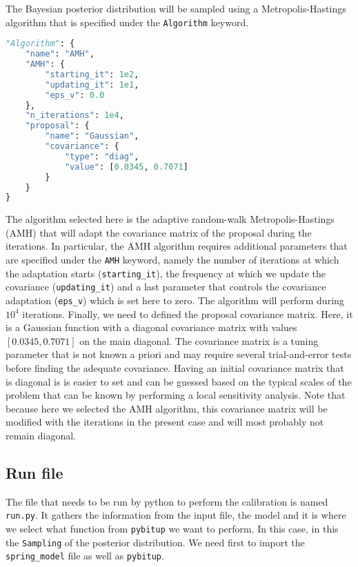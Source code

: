 \documentclass[a4paper,11pt]{article}
\begin{document}
The Bayesian posterior distribution will be sampled using a Metropolis-Hastings algorithm that is specified under the \texttt{Algorithm} keyword.
\begin{lstlisting}[language=Python, breaklines=true, tabsize=4, backgroundcolor=\color{codegray}]
"Algorithm": {
    "name": "AMH", 
    "AMH": {
        "starting_it": 1e2, 
        "updating_it": 1e1, 
        "eps_v": 0.0
    },
    "n_iterations": 1e4, 
    "proposal": { 
        "name": "Gaussian",
        "covariance": { 
            "type": "diag", 
            "value": [0.0345, 0.7071]
        }
    }
}
\end{lstlisting}
The algorithm selected here is the adaptive random-walk Metropolis-Hastings (AMH) that will adapt the covariance matrix of the proposal during the iterations. In particular, the AMH algorithm requires additional parameters that are specified under the \texttt{AMH} keyword, namely the number of iterations at which the adaptation starts (\texttt{starting\_it}), the frequency at which we update the covariance (\texttt{updating\_it}) and a last parameter that controls the covariance adaptation (\texttt{eps\_v}) which is set here to zero. The algorithm will perform during $10^4$ iterations. Finally, we need to defined the proposal covariance matrix. Here, it is a Gaussian function with a diagonal covariance matrix with values $[0.0345, 0.7071]$ on the main diagonal. The covariance matrix is a tuning parameter that is not known a priori and may require several trial-and-error tests before finding the adequate covariance. Having an initial covariance matrix that is diagonal is is easier to set and can be guessed based on the typical scales of the problem that can be known by performing a local sensitivity analysis. Note that because here we selected the AMH algorithm, this covariance matrix will be modified with the iterations in the present case and will most probably not remain diagonal.


\subsection{Run file} 

The file that needs to be run by python to perform the calibration is named \texttt{run.py}. It gathers the information from the input file, the model and it is where we select what function from \texttt{pybitup} we want to perform. In this case, in this the \texttt{Sampling} of the posterior distribution. We need first to import the \texttt{spring\_model} file as well as \texttt{pybitup}.
\end{document}
